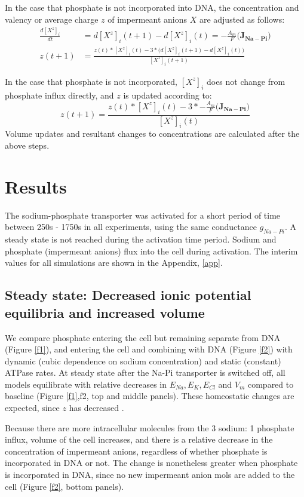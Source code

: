 \documentclass[11pt]{article}[]
\begin{document}
In the case that phosphate is not incorporated into DNA, the concentration and valency or average charge $z$ of impermeant anions $X$ are adjusted as follows:
\begin{eqnarray}
\frac{d[X^z]_i}{dt} & = d[X^z]_i(t+1) - d[X^z]_i (t) = -\frac{A_m}{F} \big(\mathbf{J_{Na-Pi}}\big) \\
z(t+1) &= \frac{z(t)*[X^z]_i (t) -3*\big(d[X^z]_i(t+1) - d[X^z]_i (t)\big)}{[X^z]_i(t+1)}
\end{eqnarray}

In the case that phosphate is not incorporated, $[X^z]_i$ does not change from phosphate influx directly, and $z$ is updated according to:
\begin{equation}
z(t+1) = \frac{z(t)*[X^z]_i (t) -3*-\frac{A_m}{F} \big(\mathbf{J_{Na-Pi}}\big)}{[X^z]_i(t)}
\end{equation}
Volume updates and resultant changes to concentrations are calculated after the above steps.

\section{Results}

The sodium-phosphate transporter was activated for a short period of time between 250s - 1750s in all experiments, using the same conductance $g_{Na-Pi}$. A steady state is not reached during the activation time period. Sodium and phosphate (impermeant anions) flux into the cell during activation. The interim values for all simulations are shown in the Appendix, \ref{app}.

\subsection{Steady state: Decreased ionic potential equilibria and increased volume}

We compare phosphate entering the cell but remaining separate from DNA (Figure \ref{f1}), and entering the cell and combining with DNA (Figure \ref{f2}) with dynamic (cubic dependence on sodium concentration) and static (constant) ATPase rates. At steady state after the Na-Pi transporter is switched off, all models equilibrate with relative decreases in $E_{Na},E_K,E_{Cl}$ and $V_m$ compared to baseline (Figure \ref{f1},f{2}, top and middle panels). These homeostatic changes are expected, since $z$ has decreased \cite{Dusterwald2018}.

Because there are more intracellular molecules from the 3 sodium: 1 phosphate influx, volume of the cell increases, and there is a relative decrease in the concentration of impermeant anions, regardless of whether phosphate is incorporated in DNA or not. The change is nonetheless greater when phosphate is incorporated in DNA, since no new impermeant anion mols are added to the cell (Figure \ref{f2}, bottom panels).
\end{document}

